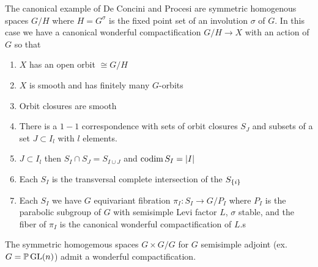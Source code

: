 \documentclass[12pt]{article}
\begin{document}
\begin{example}
    The canonical example of De Concini and Procesi are symmetric homogenous spaces $G/H$ where $H = G^\sigma$ is the fixed point set of an involution $\sigma$ of $G$.
    In this case we have a canonical wonderful compactification $G/H \to X$ with an action of $G$ so that \begin{enumerate}
        \item $X$ has an open orbit $\cong G/H$
        \item $X$ is smooth and has finitely many $G$-orbits
        \item Orbit closures are smooth 
        \item There is a $1-1$ correspondence with sets of orbit closures $S_J$ and subsets of a set $J \subset I_l$ with $l$ elements.
        \item $J \subset I_l$ then $S_I \cap S_J = S_{I\cup J}$ and $\operatorname{codim} S_I = \lvert I\vert$
        \item Each $S_I$ is the transversal complete intersection of the $S_{\{i\}}$
        \item Each $S_I$ we have $G$ equivariant fibration $\pi_I:S_I\to G/P_I$ where $P_I$ is the parabolic subgroup of $G$ with semisimple Levi factor $L$, $\sigma$ stable, 
        and the fiber of $\pi_I$ is the canonical wonderful compactification of $L$.s
    \end{enumerate}

\end{example}

\begin{example}
    The symmetric homogemous spaces $G\times G/G$ for $G$ semisimple adjoint (ex. $G = \mathbb{P}\operatorname{GL}(n)$) admit a wonderful compactification.
\end{example}
\end{document}
